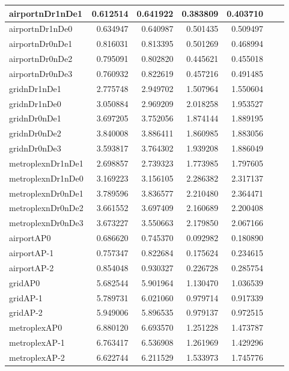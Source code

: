 \begin{longtable}{|l|r|r|r|r|r|r|}
\endlastfoot
airportnDr1nDe1 & 0.612514 & 0.641922 & 0.383809 & 0.403710 \\ \hline
airportnDr1nDe0 & 0.634947 & 0.640987 & 0.501435 & 0.509497 \\ \hline
airportnDr0nDe1 & 0.816031 & 0.813395 & 0.501269 & 0.468994 \\ \hline
airportnDr0nDe2 & 0.795091 & 0.802820 & 0.445621 & 0.455018 \\ \hline
airportnDr0nDe3 & 0.760932 & 0.822619 & 0.457216 & 0.491485 \\ \hline
gridnDr1nDe1 & 2.775748 & 2.949702 & 1.507964 & 1.550604 \\ \hline
gridnDr1nDe0 & 3.050884 & 2.969209 & 2.018258 & 1.953527 \\ \hline
gridnDr0nDe1 & 3.697205 & 3.752056 & 1.874144 & 1.889195 \\ \hline
gridnDr0nDe2 & 3.840008 & 3.886411 & 1.860985 & 1.883056 \\ \hline
gridnDr0nDe3 & 3.593817 & 3.764302 & 1.939208 & 1.886049 \\ \hline
metroplexnDr1nDe1 & 2.698857 & 2.739323 & 1.773985 & 1.797605 \\ \hline
metroplexnDr1nDe0 & 3.169223 & 3.156105 & 2.286382 & 2.317137 \\ \hline
metroplexnDr0nDe1 & 3.789596 & 3.836577 & 2.210480 & 2.364471 \\ \hline
metroplexnDr0nDe2 & 3.661552 & 3.697409 & 2.160689 & 2.200408 \\ \hline
metroplexnDr0nDe3 & 3.673227 & 3.550663 & 2.179850 & 2.067166 \\ \hline
airportAP0 & 0.686620 & 0.745370 & 0.092982 & 0.180890 \\ \hline
airportAP-1 & 0.757347 & 0.822684 & 0.175624 & 0.234615 \\ \hline
airportAP-2 & 0.854048 & 0.930327 & 0.226728 & 0.285754 \\ \hline
gridAP0 & 5.682544 & 5.901964 & 1.130470 & 1.036539 \\ \hline
gridAP-1 & 5.789731 & 6.021060 & 0.979714 & 0.917339 \\ \hline
gridAP-2 & 5.949006 & 5.896535 & 0.979137 & 0.972515 \\ \hline
metroplexAP0 & 6.880120 & 6.693570 & 1.251228 & 1.473787 \\ \hline
metroplexAP-1 & 6.763417 & 6.536908 & 1.261969 & 1.429296 \\ \hline
metroplexAP-2 & 6.622744 & 6.211529 & 1.533973 & 1.745776 \\ \hline

\end{longtable}
